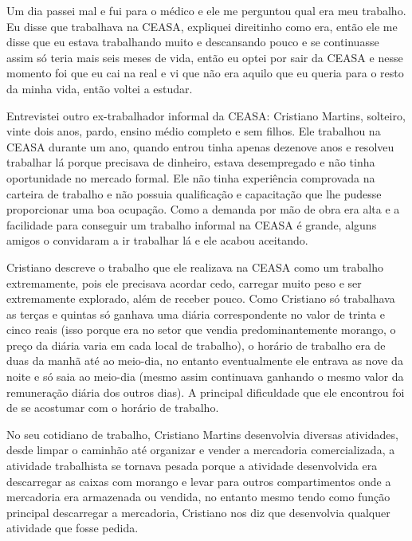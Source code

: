 \begin{citacao}
Um dia passei mal e fui para o médico e ele me perguntou qual era meu trabalho. Eu disse que trabalhava na CEASA, expliquei direitinho como era, então ele me disse que eu estava trabalhando muito e descansando pouco e se continuasse assim só teria mais seis meses de vida, então eu optei por sair da CEASA e nesse momento foi que eu cai na real e vi que não era aquilo que eu queria para o resto da minha vida, então voltei a estudar. 
\end{citacao}

Entrevistei outro ex-trabalhador informal da CEASA: Cristiano Martins, solteiro, vinte dois anos, pardo, ensino médio completo e sem filhos. Ele trabalhou na CEASA durante um ano, quando entrou tinha apenas dezenove anos e resolveu trabalhar lá porque precisava de dinheiro, estava desempregado e não tinha oportunidade no mercado formal. Ele não tinha experiência comprovada na carteira de trabalho e não possuia qualificação e capacitação que lhe pudesse proporcionar uma boa ocupação. Como a demanda por mão de obra era alta e a facilidade para conseguir um trabalho informal na CEASA é grande, alguns amigos o convidaram a ir trabalhar lá e ele acabou aceitando.

Cristiano descreve o trabalho que ele realizava na CEASA como um trabalho extremamente, pois ele precisava acordar cedo, carregar muito peso e ser extremamente explorado, além de receber pouco. Como Cristiano só trabalhava as terças e quintas só ganhava uma diária correspondente no valor de trinta e cinco reais (isso porque era no setor que vendia predominantemente morango, o preço da diária varia em cada local de trabalho), o horário de trabalho era de duas da manhã até ao meio-dia, no entanto eventualmente ele entrava as nove da noite e só saia ao meio-dia (mesmo assim continuava ganhando o mesmo valor da remuneração diária dos outros dias). A principal dificuldade que ele encontrou foi de se acostumar com o horário de trabalho.

No seu cotidiano de trabalho, Cristiano Martins desenvolvia diversas atividades, desde limpar o caminhão até organizar e vender a mercadoria comercializada, a atividade trabalhista se tornava pesada porque a atividade desenvolvida era descarregar as caixas com morango e levar para outros compartimentos onde a mercadoria era armazenada ou vendida, no entanto mesmo tendo como função principal descarregar a mercadoria, Cristiano nos diz que desenvolvia qualquer atividade que fosse pedida.

